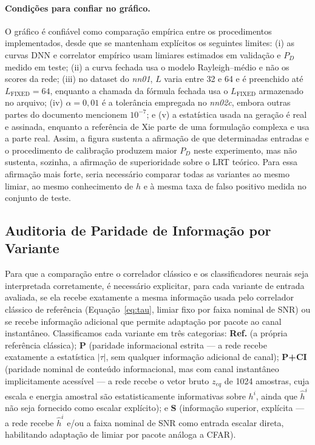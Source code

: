 \documentclass[12pt,a4paper]{article}
\begin{document}
\paragraph{Condições para confiar no gráfico.}
O gráfico é confiável como comparação empírica entre os procedimentos implementados, desde que se mantenham explícitos os seguintes limites: (i) as curvas DNN e correlator empírico usam limiares estimados em validação e $P_D$ medido em teste; (ii) a curva fechada usa o modelo Rayleigh--médio e não os scores da rede; (iii) no dataset do \textit{nn01}, $L$ varia entre 32 e 64 e é preenchido até $L_{\mathrm{FIXED}}=64$, enquanto a chamada da fórmula fechada usa o $L_{\mathrm{FIXED}}$ armazenado no arquivo; (iv) $\alpha=0{,}01$ é a tolerância empregada no \textit{nn02c}, embora outras partes do documento mencionem $10^{-7}$; e (v) a estatística usada na geração é real e assinada, enquanto a referência de Xie parte de uma formulação complexa e usa a parte real. Assim, a figura sustenta a afirmação de que determinadas entradas e o procedimento de calibração produzem maior $P_D$ neste experimento, mas não sustenta, sozinha, a afirmação de superioridade sobre o LRT teórico. Para essa afirmação mais forte, seria necessário comparar todas as variantes ao mesmo limiar, ao mesmo conhecimento de $h$ e à mesma taxa de falso positivo medida no conjunto de teste.

\subsection{Auditoria de Paridade de Informação por Variante}\label{sec:info_audit}

Para que a comparação entre o correlador clássico e os classificadores neurais seja interpretada corretamente, é necessário explicitar, para cada variante de entrada avaliada, se ela recebe exatamente a mesma informação usada pelo correlador clássico de referência (Equação~\eqref{eq:tau}, limiar fixo por faixa nominal de SNR) ou se recebe informação adicional que permite adaptação por pacote ao canal instantâneo. Classificamos cada variante em três categorias: \textbf{Ref.} (a própria referência clássica); \textbf{P} (paridade informacional estrita --- a rede recebe exatamente a estatística $|\tau|$, sem qualquer informação adicional de canal); \textbf{P+CI} (paridade nominal de conteúdo informacional, mas com canal instantâneo implicitamente acessível --- a rede recebe o vetor bruto $z_{eq}$ de 1024 amostras, cuja escala e energia amostral são estatisticamente informativas sobre $h^i$, ainda que $\hat{h}^i$ não seja fornecido como escalar explícito); e \textbf{S} (informação superior, explícita --- a rede recebe $\hat{h}^i$ e/ou a faixa nominal de SNR como entrada escalar direta, habilitando adaptação de limiar por pacote análoga a CFAR).
\end{document}
